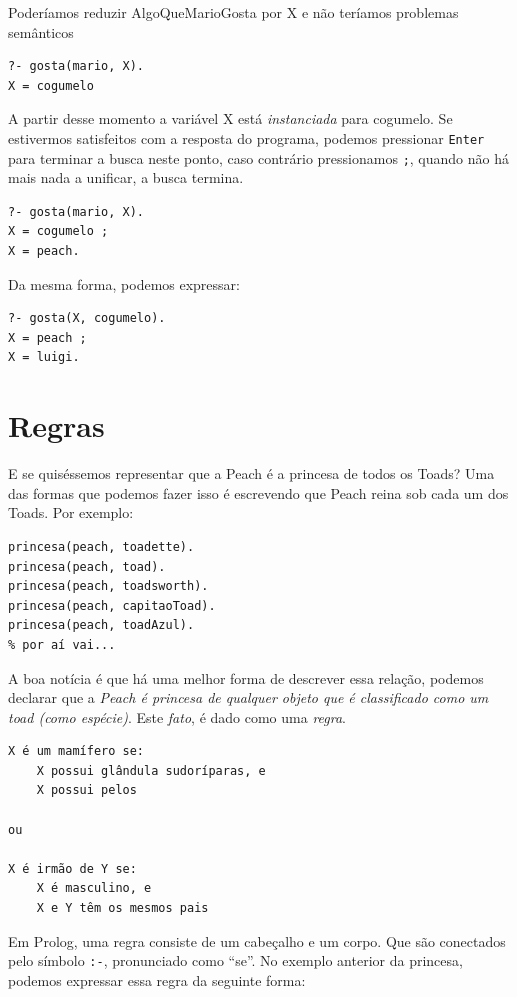 Poderíamos reduzir AlgoQueMarioGosta por X e não teríamos problemas semânticos

\begin{verbatim}
?- gosta(mario, X).
X = cogumelo
\end{verbatim}

A partir desse momento a variável X está \emph{instanciada} para cogumelo. Se
estivermos satisfeitos com a resposta do programa, podemos pressionar
\texttt{Enter} para terminar a busca neste ponto, caso contrário pressionamos
\texttt{;}, quando não há mais nada a unificar, a busca termina.

\begin{verbatim}
?- gosta(mario, X).
X = cogumelo ;
X = peach.
\end{verbatim}

Da mesma forma, podemos expressar:

\begin{verbatim}
?- gosta(X, cogumelo).
X = peach ;
X = luigi.
\end{verbatim}


\section{Regras}
E se quiséssemos representar que a Peach é a princesa de todos os Toads? Uma das
formas que podemos fazer isso é escrevendo que Peach reina sob cada um dos
Toads. Por exemplo:

\label{exemplo_peach}
\begin{verbatim}
princesa(peach, toadette).
princesa(peach, toad).
princesa(peach, toadsworth).
princesa(peach, capitaoToad).
princesa(peach, toadAzul).
% por aí vai...
\end{verbatim}

A boa notícia é que há uma melhor forma de descrever essa relação, podemos
declarar que a \emph{Peach é princesa de qualquer objeto que é classificado como
um toad (como espécie)}. Este \emph{fato}, é dado como uma \emph{regra}.

\begin{verbatim}
X é um mamífero se:
    X possui glândula sudoríparas, e
    X possui pelos

ou

X é irmão de Y se:
    X é masculino, e
    X e Y têm os mesmos pais
\end{verbatim}

Em Prolog, uma regra consiste de um cabeçalho e um corpo. Que são conectados
pelo símbolo \texttt{:-}, pronunciado como ``se''. No exemplo anterior da
princesa, podemos expressar essa regra da seguinte forma:

